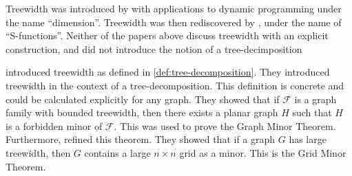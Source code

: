 Treewidth was introduced by \textcite{berteleChapterEliminationVariables1972} with applications to dynamic programming under the name ``dimension''. Treewidth was then rediscovered by \textcite{halinSfunctionsGraphs1976}, under the name of ``S-functions''. Neither of the papers above discuss treewidth with an explicit construction, and did not introduce the notion of a tree-decimposition 

\textcite{robertsonGraphMinorsIII1984} introduced treewidth as defined in \cref{def:tree-decomposition}. They introduced treewidth in the context of a tree-decomposition. This definition is concrete and could be calculated explicitly for any graph. They showed that if $\mathcal{F}$ is a graph family with bounded treewidth, then there exists a planar graph $H$ such that $H$ is a forbidden minor of $\mathcal{F}$. This was used to prove the Graph Minor Theorem. Furthermore, \textcite{robertsonQuicklyExcludingPlanar1994} refined this theorem. They showed that if a graph $G$ has large treewidth, then $G$ contains a large $n \times n$ grid as a minor. This is the Grid Minor Theorem.